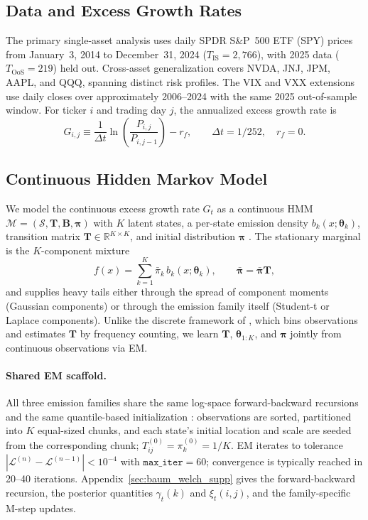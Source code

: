 \subsection{Data and Excess Growth Rates}
\label{sec:data}

The primary single-asset analysis uses daily SPDR S\&P~500 ETF (SPY) prices from January~3, 2014 to December~31, 2024 ($T_{\text{IS}} = 2{,}766$), with 2025 data ($T_{\text{OoS}} = 219$) held out.
Cross-asset generalization covers NVDA, JNJ, JPM, AAPL, and QQQ, spanning distinct risk profiles.
The VIX and VXX extensions use daily closes over approximately 2006--2024 with the same 2025 out-of-sample window.
For ticker $i$ and trading day $j$, the annualized excess growth rate is
\begin{equation}
    G_{i,j} \equiv \frac{1}{\Delta t} \ln\!\left(\frac{P_{i,j}}{P_{i,j-1}}\right) - r_f,
    \qquad \Delta t = 1/252, \quad r_f = 0.
    \label{eq:growth_rate}
\end{equation}

\subsection{Continuous Hidden Markov Model}
\label{sec:chmm_def}

We model the continuous excess growth rate $G_t$ as a continuous HMM
$\mathcal{M} = (\mathcal{S}, \mathbf{T}, \mathbf{B}, \boldsymbol{\pi})$
with $K$ latent states, a per-state emission density $b_k(x; \boldsymbol\theta_k)$,
transition matrix $\mathbf{T} \in \mathbb{R}^{K \times K}$, and initial
distribution $\boldsymbol{\pi}$ \cite{rabiner1986introduction}.
The stationary marginal is the $K$-component mixture
\begin{equation}
    f(x) = \sum_{k=1}^{K} \bar{\pi}_k\, b_k(x; \boldsymbol\theta_k),
    \qquad \bar{\boldsymbol{\pi}} = \bar{\boldsymbol{\pi}} \mathbf{T},
    \label{eq:mixture}
\end{equation}
and supplies heavy tails either through the spread of component moments
(Gaussian components) or through the emission family itself (Student-t or
Laplace components).
Unlike the discrete framework of \citet{alswaidan2026hybrid}, which bins
observations and estimates $\mathbf{T}$ by frequency counting, we learn
$\mathbf{T}$, $\boldsymbol\theta_{1:K}$, and $\boldsymbol{\pi}$ jointly
from continuous observations via EM.

\paragraph{Shared EM scaffold.}
All three emission families share the same log-space forward-backward
recursions and the same quantile-based initialization \cite{bilmes1998gentle}:
observations are sorted, partitioned into $K$ equal-sized chunks, and each
state's initial location and scale are seeded from the corresponding chunk;
$T_{ij}^{(0)} = \pi_k^{(0)} = 1/K$.
EM iterates to tolerance $|\mathcal{L}^{(n)} - \mathcal{L}^{(n-1)}| < 10^{-4}$
with $\texttt{max\_iter} = 60$; convergence is typically reached in
20--40 iterations.
Appendix~\ref{sec:baum_welch_supp} gives the forward-backward recursion,
the posterior quantities $\gamma_t(k)$ and $\xi_t(i, j)$, and the
family-specific M-step updates.

